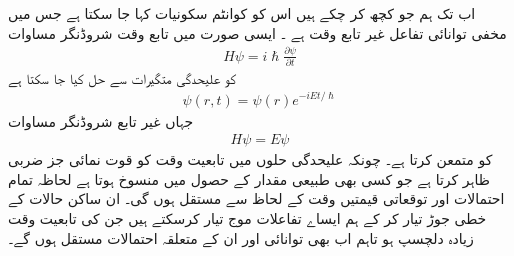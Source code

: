 
اب تک ہم جو کچھ کر چکے ہیں اس کو  کوانٹم سکونیات کہا جا سکتا ہے جس میں مخفی توانائی تفاعل غیر تابع وقت ہے ۔ ایسی صورت میں تابع وقت شروڈنگر مساوات
\begin{align*}
	H\psi=i\hslash\frac{\partial\psi}{\partial t}
\end{align*}
کو علیحدگی متگیرات سے حل کیا جا سکتا ہے 
\begin{align*}
	\psi(r, t) = \psi(r)e^{-iEt/\hslash}
\end{align*}
جہاں  غیر تابع شروڈنگر مساوات	
\begin{align*}
	H\psi=E\psi
\end{align*}
کو متمعن کرتا ہے۔ چونکہ علیحدگی حلوں میں تابعیت وقت کو قوت نمائی جز ضربی  ظاہر کرتا ہے جو کسی بھی طبیعی مقدار کے حصول میں منسوخ ہوتا ہے  لحاظہ تمام احتمالات اور توقعاتی قیمتیں وقت کے لحاظ سے مستقل ہوں گی۔ ان ساکن حالات کے خطی جوڑ تیار کر کے ہم ایساے تفاعلات موج تیار کرسکتے ہیں جن کی تابعیت وقت زیادہ دلچسپ ہو تاہم اب بھی توانائی اور ان کے متعلقہ احتمالات مستقل ہوں گے۔

